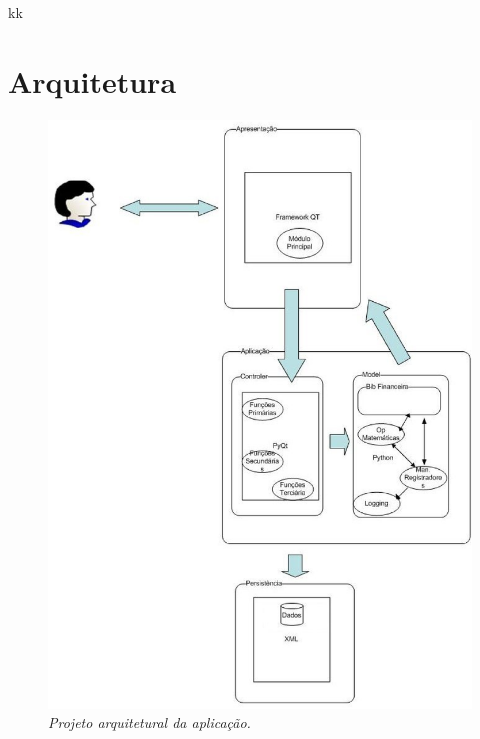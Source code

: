 kk
\chapter{Arquitetura}

\begin{figure}[!h]
 \includegraphics[scale=0.5]{arquitetura.eps}
 \caption{\it Projeto arquitetural da aplicação.} \label{fig:arquit}
\end{figure}

